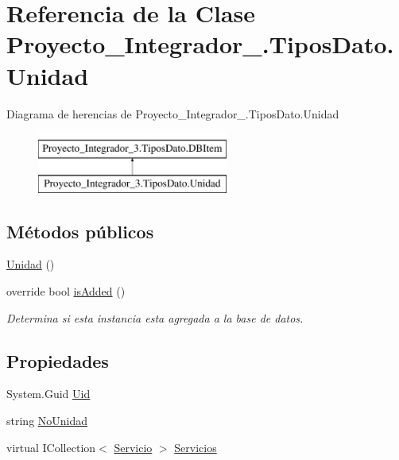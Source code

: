 \hypertarget{class_proyecto___integrador__3_1_1_tipos_dato_1_1_unidad}{\section{Referencia de la Clase Proyecto\-\_\-\-Integrador\-\_.\-Tipos\-Dato.\-Unidad}
\label{class_proyecto___integrador__3_1_1_tipos_dato_1_1_unidad}
}
Diagrama de herencias de Proyecto\-\_\-\-Integrador\-\_.\-Tipos\-Dato.\-Unidad\begin{figure}[H]
\begin{center}
\leavevmode
\includegraphics[height=2.000000cm]{d7/dff/class_proyecto___integrador__3_1_1_tipos_dato_1_1_unidad}
\end{center}
\end{figure}
\subsection*{Métodos públicos}
\begin{DoxyCompactItemize}
\item 
\hyperlink{class_proyecto___integrador__3_1_1_tipos_dato_1_1_unidad_adcd7f607349eab8b07b34e7761b78aaa}{Unidad} ()
\item 
override bool \hyperlink{class_proyecto___integrador__3_1_1_tipos_dato_1_1_unidad_a6566d517c25b9048021422510c544611}{is\-Added} ()
\begin{DoxyCompactList}\small\item\em Determina si esta instancia esta agregada a la base de datos. \end{DoxyCompactList}\end{DoxyCompactItemize}
\subsection*{Propiedades}
\begin{DoxyCompactItemize}
\item 
System.\-Guid \hyperlink{class_proyecto___integrador__3_1_1_tipos_dato_1_1_unidad_aa2e602251694986f3d519ee3db5ffa38}{Uid}
\item 
string \hyperlink{class_proyecto___integrador__3_1_1_tipos_dato_1_1_unidad_a75d59e9f06c1422def3f8630d2a33642}{No\-Unidad}
\item 
virtual I\-Collection$<$ \hyperlink{class_proyecto___integrador__3_1_1_tipos_dato_1_1_servicio}{Servicio} $>$ \hyperlink{class_proyecto___integrador__3_1_1_tipos_dato_1_1_unidad_aca85e685e50da0af6be67e3ee69b1bb1}{Servicios}
\end{DoxyCompactItemize}
